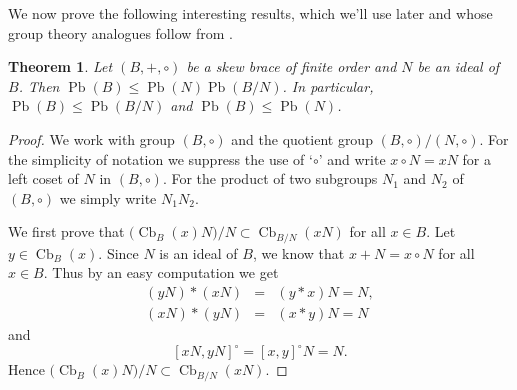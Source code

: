 \documentclass[oneside]{amsart}
\numberwithin{equation}{section}
\theoremstyle{plain}
\newtheorem{thm}[equation]{Theorem}
\theoremstyle{definition}
\newcommand{\Cb}{\operatorname{Cb} }
\newcommand{\Pb}{\operatorname{Pb} }
\begin{document}
We now prove the following interesting results, which we'll use later and whose group theory analogues follow from \cite{PG70}.
\begin{thm}\label{Ideal and cbd}
Let $(B,+, \circ)$ be a  skew  brace of finite order and $N$ be an ideal of $B$. Then $\Pb(B)\leqslant \Pb(N)\Pb(B/N)$. In particular, $\Pb(B)\leqslant \Pb(B/N)$ and $\Pb(B) \leqslant \Pb(N)$.
\end{thm}
\begin{proof}
We work with group $(B, \circ)$ and the quotient group $(B, \circ)/(N, \circ)$. For the simplicity of notation we suppress the use of `$\circ$' and write $x \circ N = xN$ for a left coset of $N$ in $(B, \circ)$. For the product of two subgroups $N_1$ and $N_2$  of $(B, \circ)$ we simply write $N_1 N_2$.

 We first prove that $({\Cb_{B}(x)  N)/N} \subset \Cb_{B/N}(x  N)$ for all $x\in B$. Let $y \in \Cb_{B}(x)$.  Since $N$ is an ideal of $B$, we know that 
  $x + N = x \circ N$ for all $x \in B$. Thus by an easy computation we get 
 \begin{eqnarray*}
 (y  N) * (x  N) &=& (y*x)  N  = N,\\
  (x  N) * (y  N) &=& (x*y)  N  = N
  \end{eqnarray*}
  and 
  $$[x N, y  N]^{\circ} = [x, y]^{\circ}  N  = N.$$
Hence $({\Cb_{B}(x)  N)/N} \subset \Cb_{B/N}(x N)$.


\end{proof}
\end{document}

